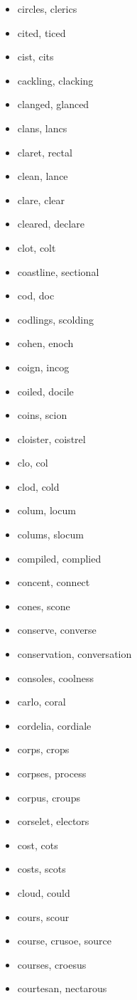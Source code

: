 \documentclass[a4wide,11pt]{report}
\begin{document}
\begin{itemize}
  \item circles, clerics
  \item cited, ticed
  \item cist, cits
  \item cackling, clacking
  \item clanged, glanced
  \item clans, lancs
  \item claret, rectal
  \item clean, lance
  \item clare, clear
  \item cleared, declare
  \item clot, colt
  \item coastline, sectional
  \item cod, doc
  \item codlings, scolding
  \item cohen, enoch
  \item coign, incog
  \item coiled, docile
  \item coins, scion
  \item cloister, coistrel
  \item clo, col
  \item clod, cold
  \item colum, locum
  \item colums, slocum
  \item compiled, complied
  \item concent, connect
  \item cones, scone
  \item conserve, converse
  \item conservation, conversation
  \item consoles, coolness
  \item carlo, coral
  \item cordelia, cordiale
  \item corps, crops
  \item corpses, process
  \item corpus, croups
  \item corselet, electors
  \item cost, cots
  \item costs, scots
  \item cloud, could
  \item cours, scour
  \item course, crusoe, source
  \item courses, croesus
  \item courtesan, nectarous

\end{itemize}
\end{document}
